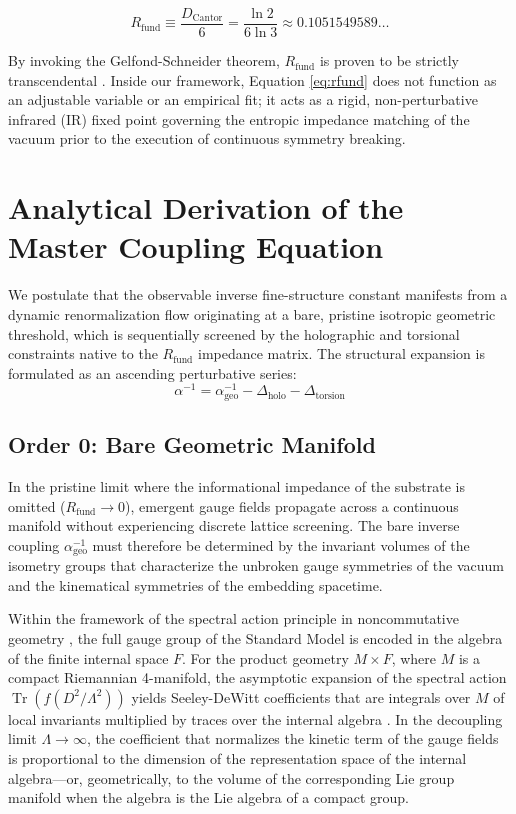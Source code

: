 \documentclass[12pt,a4paper]{article}
\begin{document}
\begin{equation}
R_{\text{fund}} \equiv \frac{D_{\text{Cantor}}}{6} = \frac{\ln 2}{6 \ln 3} \approx 0.1051549589\dots
\label{eq:rfund}
\end{equation}

By invoking the Gelfond-Schneider theorem, $R_{\text{fund}}$ is proven to be strictly transcendental \cite{peinador2026_foundational}. Inside our framework, Equation \eqref{eq:rfund} does not function as an adjustable variable or an empirical fit; it acts as a rigid, non-perturbative infrared (IR) fixed point governing the entropic impedance matching of the vacuum prior to the execution of continuous symmetry breaking.


\section{Analytical Derivation of the Master Coupling Equation}

We postulate that the observable inverse fine-structure constant manifests from a dynamic renormalization flow originating at a bare, pristine isotropic geometric threshold, which is sequentially screened by the holographic and torsional constraints native to the $R_{\text{fund}}$ impedance matrix. The structural expansion is formulated as an ascending perturbative series:
\begin{equation}
\alpha^{-1} = \alpha^{-1}_{\text{geo}} - \Delta_{\text{holo}} - \Delta_{\text{torsion}}
\end{equation}

\subsection{Order 0: Bare Geometric Manifold}

In the pristine limit where the informational impedance of the substrate is omitted ($R_{\text{fund}} \to 0$), emergent gauge fields propagate across a continuous manifold without experiencing discrete lattice screening. The bare inverse coupling $\alpha^{-1}_{\text{geo}}$ must therefore be determined by the invariant volumes of the isometry groups that characterize the unbroken gauge symmetries of the vacuum and the kinematical symmetries of the embedding spacetime.

Within the framework of the spectral action principle in noncommutative geometry \cite{chamseddine1997}, the full gauge group of the Standard Model is encoded in the algebra of the finite internal space $F$. For the product geometry $M \times F$, where $M$ is a compact Riemannian 4-manifold, the asymptotic expansion of the spectral action $\operatorname{Tr}(f(D^2/\Lambda^2))$ yields Seeley-DeWitt coefficients that are integrals over $M$ of local invariants multiplied by traces over the internal algebra \cite{connes1996}. In the decoupling limit $\Lambda \to \infty$, the coefficient that normalizes the kinetic term of the gauge fields is proportional to the dimension of the representation space of the internal algebra---or, geometrically, to the volume of the corresponding Lie group manifold when the algebra is the Lie algebra of a compact group.
\end{document}
